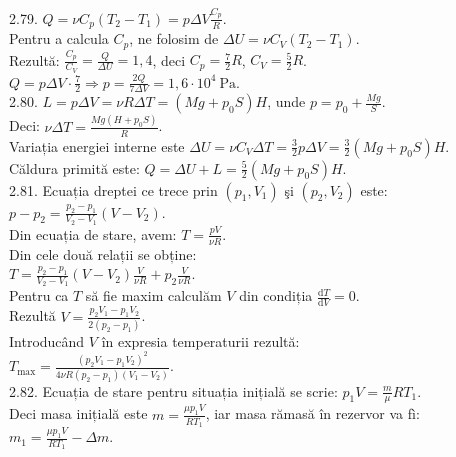 2.79. $Q=\nu C_{p}\left(T_{2}-T_{1}\right)=p \Delta V \frac{C_{p}}{R}$.\\ Pentru a calcula $C_{p}$, ne folosim de $\Delta U=\nu C_{V}\left(T_{2}-T_{1}\right)$.\\ Rezultă: $\frac{C_{p}}{C_{V}}=\frac{Q}{\Delta U}=1,4$, deci $C_{p}=\frac{7}{2} R$, $C_{V}=\frac{5}{2} R$.\\ $Q=p \Delta V \cdot \frac{7}{2} \Rightarrow p=\frac{2 Q}{7 \Delta V}=1,6 \cdot 10^{4} \mathrm{~Pa}$.\\

2.80. $L=p \Delta V=\nu R \Delta T=\left(M g+p_{0} S\right) H$, unde $p=p_{0}+\frac{M g}{S}$.\\ Deci: $\nu \Delta T=\frac{M g\left(H+p_{0} S\right)}{R}$.\\ Variația energiei interne este $\Delta U=\nu C_{V} \Delta T=\frac{3}{2} p \Delta V=\frac{3}{2}\left(M g+p_{0} S\right) H$.\\ Căldura primită este: $Q=\Delta U+L=\frac{5}{2}\left(M g+p_{0} S\right) H$.\\

2.81. Ecuația dreptei ce trece prin $\left(p_{1}, V_{1}\right)$ şi $\left(p_{2}, V_{2}\right)$ este:\\ $p-p_{2}=\frac{p_{2}-p_{1}}{V_{2}-V_{1}}\left(V-V_{2}\right)$.\\ Din ecuația de stare, avem: $T=\frac{p V}{\nu R}$.\\ Din cele două relații se obține:\\ $T=\frac{p_{2}-p_{1}}{V_{2}-V_{1}}\left(V-V_{2}\right) \frac{V}{\nu R}+p_{2} \frac{V}{\nu R}$.\\ Pentru ca $T$ să fie maxim calculăm $V$ din condiția $\frac{\mathrm{d} T}{\mathrm{d} V}=0$.\\ Rezultă $V=\frac{p_{2} V_{1}-p_{1} V_{2}}{2\left(p_{2}-p_{1}\right)}$.\\ Introducând $V$ în expresia temperaturii rezultă:\\ $T_{\max}=\frac{\left(p_{2} V_{1}-p_{1} V_{2}\right)^{2}}{4 \nu R\left(p_{2}-p_{1}\right)\left(V_{1}-V_{2}\right)}$.\\

2.82. Ecuația de stare pentru situația inițială se scrie: $p_{1} V=\frac{m}{\mu} R T_{1}$.\\ Deci masa inițială este $m=\frac{\mu p_{1} V}{R T_{1}}$, iar masa rămasă în rezervor va fì:\\ $m_{1}=\frac{\mu p_{1} V}{R T_{1}}-\Delta m$.\\

